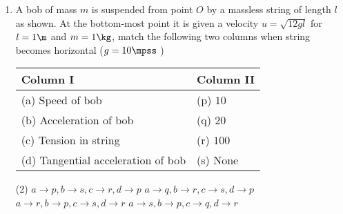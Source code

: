 \documentclass{article}
\renewcommand{\ans}{\quad}
\begin{document}
\begin{enumerate}
    \item A bob of mass $m$ is suspended from point $O$ by a massless string of length $l$ as shown. At the bottom-most point it is given a velocity $u = \sqrt{12gl}$ for $l = 1 \m$ and $m = 1 \kg$, match the following two columns when string becomes horizontal ($g = 10 \mpss$ )
    \begin{center}
    \end{center}
    \begin{center}
        \renewcommand{\arraystretch}{1.5}
        \begin{table}[h]
            \centering
            \begin{tabular}{p{6cm}|p{3cm}}
            \hline
            Column I & Column II \\
            \hline
            (a) Speed of bob & (p) $10$\\
            (b) Acceleration of bob & (q) $20$\\
            (c) Tension in string & (r) $100$\\
            (d) Tangential acceleration of bob & (s) None\\
            \hline
            \end{tabular}
        \end{table}
    \end{center}
    

    \begin{tasks}(2)
        \task $a \rightarrow p, b \rightarrow s, c \rightarrow r, d \rightarrow p$\ans
        \task $a \rightarrow q, b \rightarrow r, c \rightarrow s, d \rightarrow p$
        \task $a \rightarrow r, b \rightarrow p, c \rightarrow s, d \rightarrow r$
        \task $a \rightarrow s, b \rightarrow p, c \rightarrow q, d \rightarrow r$
    \end{tasks}



\end{enumerate}


\vspace*{\fill}


\end{document}
